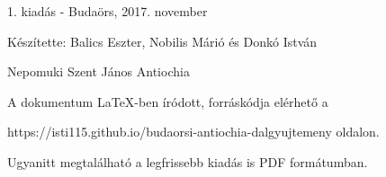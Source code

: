 \documentclass[a5paper,twoside]{article}
\renewcommand{\_}[1]{\underline{#1}} %
\begin{document}
  \begin{songs}{}
    
  \end{songs}

  \begin{songs}{}
    
  \end{songs}

  \newpage\null\newpage
  \thispagestyle{empty}

  \vspace*{\fill}
  1. kiadás - Budaörs, 2017. november

  \vspace{0.3cm}

  Készítette: Balics Eszter, Nobilis Márió és Donkó István

  Nepomuki Szent János Antiochia

  \vspace{0.3cm}

  A dokumentum LaTeX-ben íródott, forráskódja elérhető a

  https://isti115.github.io/budaorsi-antiochia-dalgyujtemeny oldalon.

  Ugyanitt megtalálható a legfrissebb kiadás is PDF formátumban.
\end{document}
